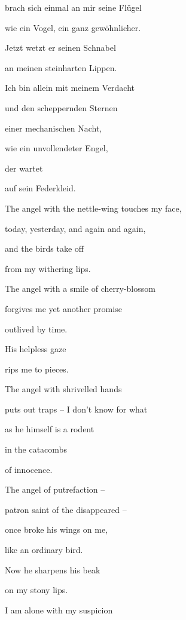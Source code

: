 brach sich einmal an mir seine Flügel

wie ein Vogel, ein ganz gewöhnlicher.


\bigskip

Jetzt wetzt er seinen Schnabel

an meinen steinharten Lippen.


\bigskip

Ich bin allein mit meinem Verdacht

und den scheppernden Sternen

einer mechanischen Nacht, 

wie ein unvollendeter Engel,

der wartet

auf sein Federkleid. 



\bigskip

The angel with the nettle-wing touches my face,

today, yesterday, and again and again,

and the birds take off

from my withering lips.


\bigskip

The angel with a smile of cherry-blossom

forgives me yet another promise

outlived by time.

His helpless gaze

rips me to pieces.


\bigskip

The angel with shrivelled hands

puts out traps -- I don't know for what 

as he himself is a rodent

in the catacombs

of innocence.


\bigskip

The angel of putrefaction -- 

patron saint of the disappeared -- 

once broke his wings on me,

like an ordinary bird.


\bigskip

Now he sharpens his beak

on my stony lips.


\bigskip

I am alone with my suspicion

